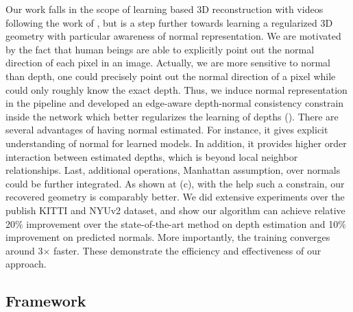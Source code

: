 Our work falls in the scope of learning based 3D reconstruction with videos following the work of \cite{zhou2017unsupervised}, but is a step further towards learning a regularized 3D geometry with particular awareness of normal representation. 
We are motivated by the fact that human beings are able to explicitly point out the normal direction of each pixel in an image. Actually, we are more sensitive to normal than depth, \eg one could precisely point out the normal direction of a pixel while could only roughly know the exact depth. 
Thus, we induce normal representation in the pipeline and developed an edge-aware depth-normal consistency constrain inside the network which better regularizes the learning of depths (). 
There are several advantages of having normal estimated. For instance, it gives explicit understanding of normal for learned models.  In addition, it provides higher order interaction between estimated depths, which is beyond local neighbor relationships. Last, additional operations, \eg Manhattan assumption, over normals could be further integrated.
As shown at (c), with the help such a constrain, our recovered geometry is comparably better. We did extensive experiments over the publish KITTI and NYUv2 dataset, and show our algorithm can achieve relative 20$\%$ improvement over the state-of-the-art method on depth estimation and 10$\%$ improvement on predicted normals. More importantly, the training converges around 3$\times$ faster. These demonstrate the efficiency and effectiveness of our approach.




\vspace{-0.6\baselineskip}
\subsection{Framework}
\label{sub:framework}
\vspace{-0.3\baselineskip}

